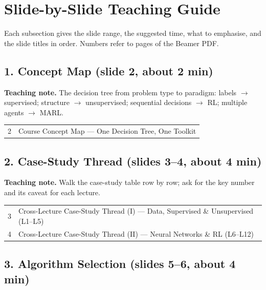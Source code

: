 \documentclass[11pt]{article}
\begin{document}
\section{Slide-by-Slide Teaching Guide}

Each subsection gives the slide range, the suggested time, what to emphasise, and the slide titles in order. Numbers refer to pages of the Beamer PDF.

\subsection{1. Concept Map \normalfont\small\color{GreyN}(slide 2, about 2 min)}

\textbf{Teaching note.} The decision tree from problem type to paradigm: labels $\to$ supervised; structure $\to$ unsupervised; sequential decisions $\to$ RL; multiple agents $\to$ MARL.

\begin{center}\small\renewcommand{\arraystretch}{1.1}\begin{tabularx}{\textwidth}{@{}r X@{}}2 & Course Concept Map --- One Decision Tree, One Toolkit\\\end{tabularx}\end{center}

\subsection{2. Case-Study Thread \normalfont\small\color{GreyN}(slides 3--4, about 4 min)}

\textbf{Teaching note.} Walk the case-study table row by row; ask for the key number and its caveat for each lecture.

\begin{center}\small\renewcommand{\arraystretch}{1.1}\begin{tabularx}{\textwidth}{@{}r X@{}}3 & Cross-Lecture Case-Study Thread (I) --- Data, Supervised \& Unsupervised (L1--L5)\\
4 & Cross-Lecture Case-Study Thread (II) --- Neural Networks \& RL (L6--L12)\\\end{tabularx}\end{center}

\subsection{3. Algorithm Selection \normalfont\small\color{GreyN}(slides 5--6, about 4 min)}
\end{document}
